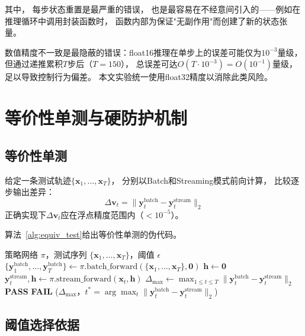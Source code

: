 其中，
每步状态重置是最严重的错误，
也是最容易在不经意间引入的——例如在推理循环中调用封装函数时，
函数内部为保证"无副作用"而创建了新的状态张量。

数值精度不一致是最隐蔽的错误：float16推理在单步上的误差可能仅为$10^{-3}$量级，
但通过递推累积$T$步后（$T=150$），
总误差可达$O(T \cdot 10^{-3}) = O(10^{-1})$量级，
足以导致控制行为偏差。
本文实验统一使用float32精度以消除此类风险。


\section{等价性单测与硬防护机制}

\subsection{等价性单测}

给定一条测试轨迹$\{\mathbf{x}_1, \ldots, \mathbf{x}_T\}$，
分别以Batch和Streaming模式前向计算，
比较逐步输出差异：
\begin{equation}
  \Delta \mathbf{v}_t = \|\mathbf{y}_t^{\text{batch}} - \mathbf{y}_t^{\text{stream}}\|_2
  \label{eq:bs_diff_ch4}
\end{equation}
正确实现下$\Delta \mathbf{v}_t$应在浮点精度范围内（$< 10^{-5}$）。

算法~\ref{alg:equiv_test}给出等价性单测的伪代码。

\begin{algorithm}[htbp]
\caption{Batch--Streaming等价性单测}
\label{alg:equiv_test}
\begin{algorithmic}[1]
\Require 策略网络 $\pi$，测试序列 $\{\mathbf{x}_1, \ldots, \mathbf{x}_T\}$，阈值 $\epsilon$
\State $\{\mathbf{y}_1^{\text{batch}}, \ldots, \mathbf{y}_T^{\text{batch}}\} \leftarrow \pi.\text{batch\_forward}(\{\mathbf{x}_1, \ldots, \mathbf{x}_T\}, \mathbf{0})$
\State $\mathbf{h} \leftarrow \mathbf{0}$
  \State $\mathbf{y}_t^{\text{stream}}, \mathbf{h} \leftarrow \pi.\text{stream\_forward}(\mathbf{x}_t, \mathbf{h})$
\EndFor
\State $\Delta_{\max} \leftarrow \max_{1 \leq t \leq T}\|\mathbf{y}_t^{\text{batch}} - \mathbf{y}_t^{\text{stream}}\|_2$
\If{$\Delta_{\max} < \epsilon$}
  \State \Return \textbf{PASS}
\Else
  \State \Return \textbf{FAIL} ($\Delta_{\max}$，$t^*=\arg\max_t\|\mathbf{y}_t^{\text{batch}} - \mathbf{y}_t^{\text{stream}}\|_2$)
\EndIf
\end{algorithmic}
\end{algorithm}
\FloatBarrier

\subsection{阈值选择依据}

